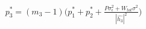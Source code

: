 \documentclass[preview]{standalone}
\begin{document}
\begin{align*}
p_3^\ast = \left(m_3 - 1\right) \bigg( p_1^\ast + p_2^\ast + \frac{P \sigma_\epsilon^2 + W_{tot} \sigma^2}{\left|\hat{h_3}\right|^2} \bigg)
\end{align*}
\end{document}
